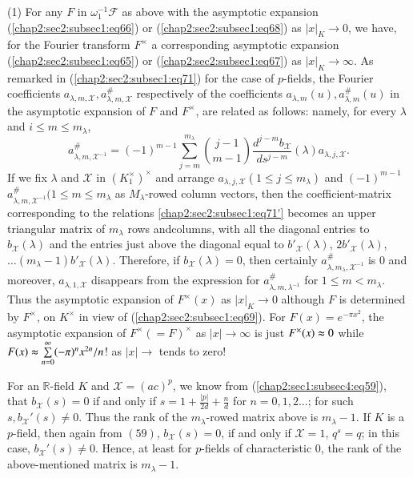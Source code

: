 \begin{Remarks*}
(1) For any $F$ in $\omega_{1}^{-1}\mathscr{F}$ as above with the
  asymptotic expansion (\ref{chap2:sec2:subsec1:eq66}) or
  (\ref{chap2:sec2:subsec1:eq68}) as $|x|_{K}\rightarrow 0$, we
  have, for the Fourier transform $F^{\times}$ a corresponding
  asymptotic expansion (\ref{chap2:sec2:subsec1:eq65}) or
  (\ref{chap2:sec2:subsec1:eq67})  as $|x|_{K}\rightarrow
  \infty$. As remarked in (\ref{chap2:sec2:subsec1:eq71}) for the case
  of $p$-fields, the Fourier coefficients
  $a_{\lambda,m,\mathcal{X}},a_{\lambda,m,\mathcal{X}}^{\#}$
  respectively of the coefficients
  $a_{\lambda,m}(u),a_{\lambda,m}^{\#}(u)$ in the asymptotic expansion
    of $F$ and $F^{\times}$, are related as follows: namely, for every
    $\lambda$ and $i\le m\le m_{\lambda}$,
\begin{equation*}
  a_{\lambda,m,\mathcal{X}^{-1}}^{\#}=(-1)^{m-1}\sum\limits_{j=m}^{m_{\lambda}}
  \binom{j-1}{m-1}\frac{d^{j-m}b_{\mathcal{X}}}{ds^{j-m}}
  (\lambda)a_{\lambda,j, \mathcal{X}}.\tag*{$(71)'$}\label{chap2:sec2:subsec1:eq71'}
\end{equation*}
If we fix $\lambda$ and $\mathcal{X}$ in $(K_{1}^{\times})^{\times}$ and
arrange $a_{\lambda,j,\mathcal{X}}(1\le j\le m_{\lambda})$ and
$(-1)^{m-1}$ $a_{\lambda,m,\mathcal{X}^{-1}}^{\#}(1\le m \le m_{\lambda}$
as $M_\lambda$-rowed column vectors, then the coefficient-matrix
corresponding to the relations \ref{chap2:sec2:subsec1:eq71'} becomes an upper triangular
matrix of $m_{\lambda}$ rows and\pageoriginale columns, with all the diagonal
entries to $b_{\mathcal{X}}(\lambda)$ and the entries just above the
diagonal equal to
${b'}_{\mathcal{X}}(\lambda)$, $2{b'}_{\mathcal{X}}(\lambda)$, 
$\ldots(m_{\lambda}-1){b'}_{\mathcal{X}}(\lambda)$. Therefore, 
if $b_\mathcal{X}(\lambda)=0$, then certainly $a_{\lambda,
  m_{\lambda},\mathcal{X}^{-1}}^{\#}$ is $0$ and moreover,
$a_{\lambda, 1, \mathcal{X}}$ disappears from the expression for
$a_{\lambda, m, \lambda^{-1}}^{\#}$ for $1\le m <m_{\lambda}$. Thus
the asymptotic expansion of $F^{\times}(x)$ as $|x|_{K}\rightarrow 0$
although $F$ is determined by $F^{\times}$, on $K^{\times}$ in view of
(\ref{chap2:sec2:subsec1:eq69}). For $F(x)=e^{-\pi x^{2}}$, the
asymptotic expansion of 
$F^{\times}(=F)^{\times}$ as $|x|\rightarrow \infty$ is just
$F^{\times}(x)\thickapprox 0$ while $F(x)\thickapprox
\sum\limits_{n=0}^{\infty}(-\pi)^{n}x^{2n}/n$! as $|x|\rightarrow$
tends to zero!

 For an $\mathbb{R}$-field $K$ and $\mathcal{X}=(ac)^{p}$, we know
 from  (\ref{chap2:sec1:subsec4:eq59}), that $b_{\mathcal{X}}(s)=0$ if and only if
   $s=1+\frac{|p|}{2d}+\frac{n}{d}$ for $n=0,1,2\ldots$; for such
   $s,b_{\mathcal{X}}'(s)\neq 0$.  Thus the rank of the
 $m_{\lambda}$-rowed matrix above is $m_{\lambda}-1$. If $K$ is a
 $p$-field, then again from $(59)$, $b_{\mathcal{X}}(s)=0$, if and only
 if $\mathcal{X}=1$, $q^{s}=q$; in this case, $b_{\mathcal{X}}'(s)\neq
 0$. Hence, at least for $p$-fields of characteristic $0$, the rank of
 the above-mentioned matrix is $m_{\lambda}-1$.


\end{Remarks*}
